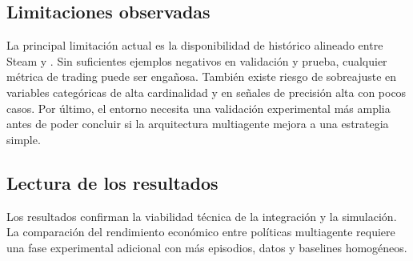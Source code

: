 \subsection{Limitaciones observadas}

La principal limitación actual es la disponibilidad de histórico alineado entre Steam y . Sin suficientes ejemplos negativos en validación y prueba, cualquier métrica de trading puede ser engañosa. También existe riesgo de sobreajuste en variables categóricas de alta cardinalidad y en señales de precisión alta con pocos casos. Por último, el entorno  necesita una validación experimental más amplia antes de poder concluir si la arquitectura multiagente mejora a una estrategia simple.

\subsection{Lectura de los resultados}

Los resultados confirman la viabilidad técnica de la integración y la simulación. La comparación del rendimiento económico entre políticas multiagente requiere una fase experimental adicional con más episodios, datos y baselines homogéneos.
